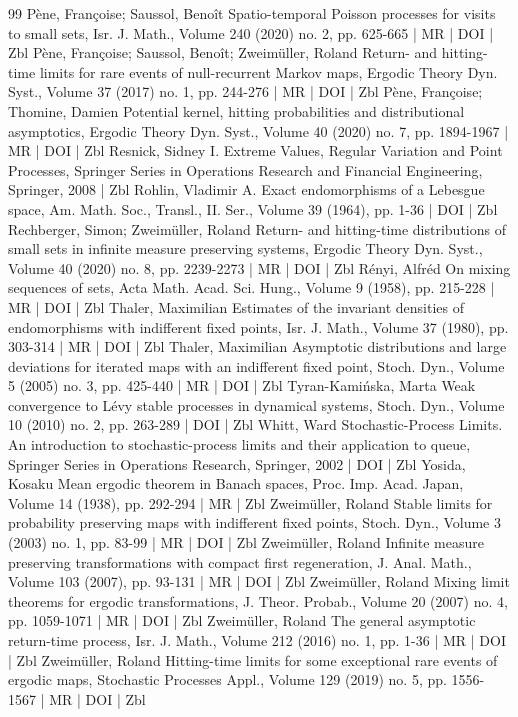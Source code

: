 \documentclass[10pt]{amsart}
\theoremstyle{definition}\newtheorem{defi}[theo]{Definition}\newtheorem{rema}[theo]{Remark}\newtheorem{exam}[theo]{Example}\newtheorem{exem}[theo]{Example}\newtheorem{nota}[theo]{Notation}
\begin{document}
\begin{thebibliography}{99}
Pène, Françoise; Saussol, Benoît Spatio-temporal Poisson processes for visits to small sets, Isr. J. Math., Volume 240 (2020) no. 2, pp. 625-665 | MR | DOI | Zbl
Pène, Françoise; Saussol, Benoît; Zweimüller, Roland Return- and hitting-time limits for rare events of null-recurrent Markov maps, Ergodic Theory Dyn. Syst., Volume 37 (2017) no. 1, pp. 244-276 | MR | DOI | Zbl
Pène, Françoise; Thomine, Damien Potential kernel, hitting probabilities and distributional asymptotics, Ergodic Theory Dyn. Syst., Volume 40 (2020) no. 7, pp. 1894-1967 | MR | DOI | Zbl
Resnick, Sidney I. Extreme Values, Regular Variation and Point Processes, Springer Series in Operations Research and Financial Engineering, Springer, 2008 | Zbl
Rohlin, Vladimir A. Exact endomorphisms of a Lebesgue space, Am. Math. Soc., Transl., II. Ser., Volume 39 (1964), pp. 1-36 | DOI | Zbl
Rechberger, Simon; Zweimüller, Roland Return- and hitting-time distributions of small sets in infinite measure preserving systems, Ergodic Theory Dyn. Syst., Volume 40 (2020) no. 8, pp. 2239-2273 | MR | DOI | Zbl
Rényi, Alfréd On mixing sequences of sets, Acta Math. Acad. Sci. Hung., Volume 9 (1958), pp. 215-228 | MR | DOI | Zbl
Thaler, Maximilian Estimates of the invariant densities of endomorphisms with indifferent fixed points, Isr. J. Math., Volume 37 (1980), pp. 303-314 | MR | DOI | Zbl
Thaler, Maximilian Asymptotic distributions and large deviations for iterated maps with an indifferent fixed point, Stoch. Dyn., Volume 5 (2005) no. 3, pp. 425-440 | MR | DOI | Zbl
Tyran-Kamińska, Marta Weak convergence to Lévy stable processes in dynamical systems, Stoch. Dyn., Volume 10 (2010) no. 2, pp. 263-289 | DOI | Zbl
Whitt, Ward Stochastic-Process Limits. An introduction to stochastic-process limits and their application to queue, Springer Series in Operations Research, Springer, 2002 | DOI | Zbl
Yosida, Kosaku Mean ergodic theorem in Banach spaces, Proc. Imp. Acad. Japan, Volume 14 (1938), pp. 292-294 | MR | Zbl
Zweimüller, Roland Stable limits for probability preserving maps with indifferent fixed points, Stoch. Dyn., Volume 3 (2003) no. 1, pp. 83-99 | MR | DOI | Zbl
Zweimüller, Roland Infinite measure preserving transformations with compact first regeneration, J. Anal. Math., Volume 103 (2007), pp. 93-131 | MR | DOI | Zbl
Zweimüller, Roland Mixing limit theorems for ergodic transformations, J. Theor. Probab., Volume 20 (2007) no. 4, pp. 1059-1071 | MR | DOI | Zbl
Zweimüller, Roland The general asymptotic return-time process, Isr. J. Math., Volume 212 (2016) no. 1, pp. 1-36 | MR | DOI | Zbl
Zweimüller, Roland Hitting-time limits for some exceptional rare events of ergodic maps, Stochastic Processes Appl., Volume 129 (2019) no. 5, pp. 1556-1567 | MR | DOI | Zbl
\end{thebibliography}
\end{document}

